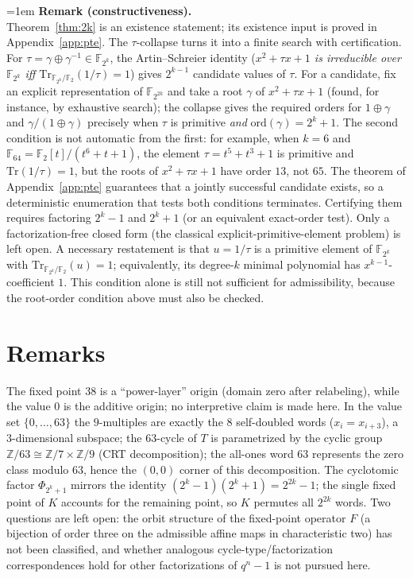 \documentclass[11pt]{article}
\begin{document}
\begingroup
\emergencystretch=1em
\noindent\textbf{Remark (constructiveness).}\\
Theorem~\ref{thm:2k} is an existence statement; its existence input is proved
in Appendix~\ref{app:pte}. The $\tau$-collapse turns it into a finite search with
certification. For $\tau=\gamma\oplus\gamma^{-1}\in\mathbb{F}_{2^k}$, the
Artin--Schreier identity
(\emph{$x^2+\tau x+1$ is irreducible over $\mathbb{F}_{2^k}$ iff
$\mathrm{Tr}_{\mathbb{F}_{2^k}/\mathbb{F}_2}(1/\tau)=1$}) gives $2^{k-1}$
candidate values of $\tau$. For a candidate, fix an explicit representation of
$\mathbb{F}_{2^{2k}}$ and take a root $\gamma$ of $x^2+\tau x+1$
(found, for instance, by exhaustive search); the collapse gives the required orders for $1\oplus\gamma$ and
$\gamma/(1\oplus\gamma)$ precisely when $\tau$ is primitive \emph{and}
$\mathrm{ord}(\gamma)=2^k+1$. The second condition is not automatic from the
first: for example, when $k=6$ and
$\mathbb{F}_{64}=\mathbb{F}_2[t]/(t^6+t+1)$, the element
$\tau=t^5+t^3+1$ is primitive and $\mathrm{Tr}(1/\tau)=1$, but the roots of
$x^2+\tau x+1$ have order $13$, not $65$. The theorem of
Appendix~\ref{app:pte} guarantees that a jointly successful candidate exists, so a
deterministic enumeration that tests both conditions terminates. Certifying them requires factoring $2^k-1$ and
$2^k+1$ (or an equivalent exact-order test). Only a factorization-free closed
form (the classical explicit-primitive-element problem) is left open.
A necessary restatement is that $u=1/\tau$ is a primitive element of
$\mathbb{F}_{2^k}$ with $\mathrm{Tr}_{\mathbb{F}_{2^k}/\mathbb{F}_2}(u)=1$;
equivalently, its degree-$k$ minimal polynomial has $x^{k-1}$-coefficient
$1$. This condition alone is still not sufficient for admissibility, because
the root-order condition above must also be checked.
\endgroup

\section{Remarks}\label{sec:rem}
The fixed point $38$ is a ``power-layer'' origin (domain zero after relabeling), while
the value $0$ is the additive origin; no interpretive claim is made here. In the value set $\{0,\dots,63\}$ the $9$-multiples are exactly the $8$ self-doubled words ($x_i=x_{i+3}$), a $3$-dimensional subspace; the $63$-cycle of $T$ is parametrized by the cyclic group $\mathbb{Z}/63\cong\mathbb{Z}/7\times\mathbb{Z}/9$ (CRT decomposition); the all-ones word $63$ represents the zero class modulo $63$, hence the $(0,0)$ corner of this decomposition. The
cyclotomic factor $\Phi_{2^k+1}$ mirrors the identity $(2^k-1)(2^k+1)=2^{2k}-1$; the
single fixed point of $K$ accounts for the remaining point, so $K$ permutes all
$2^{2k}$ words. Two questions are left open: the orbit structure of the fixed-point operator $F$
(a bijection of order three on the admissible affine maps in characteristic two)
has not been classified, and whether analogous cycle-type/factorization
correspondences hold for other factorizations of $q^n-1$ is not pursued here.
\end{document}
